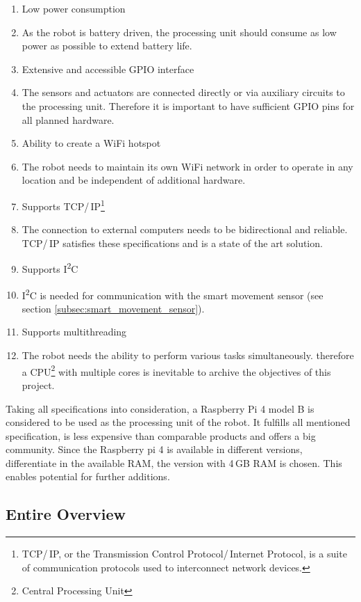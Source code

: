 \begin{enumerate}
\itemsep0em
\item Low power consumption
\item[] As the robot is battery driven, the processing unit should consume as low power as possible to extend battery life.
\item Extensive and accessible GPIO interface
\item[] The sensors and actuators are connected directly or via auxiliary circuits to the processing unit. Therefore it is important to have sufficient GPIO pins for all planned hardware.
\item Ability to create a WiFi hotspot
\item[] The robot needs to maintain its own WiFi network in order to operate in any location and be independent of additional hardware.
\item Supports TCP/\,IP\footnote{TCP/\,IP, or the Transmission Control Protocol/\,Internet Protocol, is a suite of communication protocols used to interconnect network devices.}
\item[] The connection to external computers needs to be bidirectional and reliable. TCP/\,IP satisfies these specifications and is a state of the art solution.
\item Supports I\textsuperscript{2}C
\item[] I\textsuperscript{2}C is needed for communication with the smart movement sensor (see section \ref{subsec:smart_movement_sensor}). 
\item Supports multithreading
\item[] The robot needs the ability to perform various tasks simultaneously. therefore a CPU\footnote{Central Processing Unit} with multiple cores is inevitable to archive the objectives of this project.
\end{enumerate}

Taking all specifications into consideration, a Raspberry Pi 4 model B is considered to be used as the processing unit of the robot. It fulfills all mentioned specification, is less expensive than comparable products and offers a big community. Since the Raspberry pi 4 is available in different versions, differentiate in the available RAM, the version with 4\,GB RAM is chosen. This enables potential for further additions.

\newpage

\subsection{Entire Overview}

